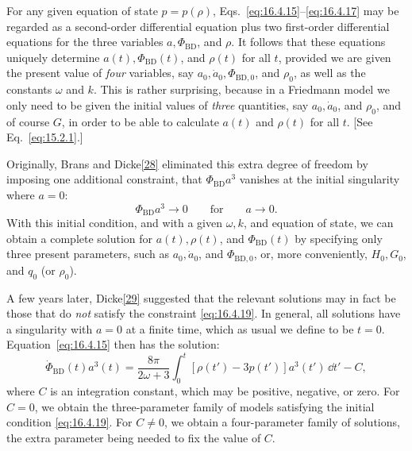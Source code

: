 For any given equation of state \(p=p(\rho)\),
Eqs.~\eqref{eq:16.4.15}--\eqref{eq:16.4.17} may be regarded as a
second-order differential equation plus two first-order differential equations
for the three variables \(a,\Phi_{\mathrm{BD}}\), and \(\rho\). It follows that
these equations uniquely determine \(a(t),\Phi_{\mathrm{BD}}(t)\), and
\(\rho(t)\) for all \(t\), provided we are given the present value of
\emph{four} variables, say \(a_0,\dot a_0,\Phi_{\mathrm{BD},0}\), and
\(\rho_0\), as well as the constants \(\omega\) and \(k\). This is rather
surprising, because in a Friedmann model we only need to be given the initial
values of \emph{three} quantities, say \(a_0,\dot a_0\), and \(\rho_0\), and
of course \(G\), in order to be able to calculate \(a(t)\) and \(\rho(t)\) for
all \(t\). [See Eq.~\eqref{eq:15.2.1}.]

Originally, Brans and Dicke\hyperref[ch16-ref-28]{[28]} eliminated this extra
degree of freedom by imposing one additional constraint, that
\(\Phi_{\mathrm{BD}}a^3\) vanishes at the initial singularity where \(a=0\):
\begin{equation}
  \Phi_{\mathrm{BD}}a^3\longrightarrow0
  \qquad\text{for}\qquad
  a\longrightarrow0.
  \tag{16.4.19}\label{eq:16.4.19}
\end{equation}
With this initial condition, and with a given \(\omega,k\), and equation of
state, we can obtain a complete solution for \(a(t),\rho(t)\), and
\(\Phi_{\mathrm{BD}}(t)\) by specifying only three present parameters, such as
\(a_0,\dot a_0\), and \(\Phi_{\mathrm{BD},0}\), or, more conveniently,
\(H_0,G_0\), and \(q_0\) (or \(\rho_0\)).

A few years later, Dicke\hyperref[ch16-ref-29]{[29]} suggested that the
relevant solutions may in fact be those that do \emph{not} satisfy the
constraint \eqref{eq:16.4.19}. In general, all solutions have a singularity
with \(a=0\) at a finite time, which as usual we define to be \(t=0\).
Equation~\eqref{eq:16.4.15} then has the solution:
\begin{equation}
  \dot\Phi_{\mathrm{BD}}(t)a^3(t)
  =
  \frac{8\pi}{2\omega+3}
  \int_0^t
    [\rho(t')-3p(t')]a^3(t')\,\dd t'
  -C,
  \tag{16.4.20}\label{eq:16.4.20}
\end{equation}
where \(C\) is an integration constant, which may be positive, negative, or
zero. For \(C=0\), we obtain the three-parameter family of models satisfying
the initial condition \eqref{eq:16.4.19}. For \(C\ne0\), we obtain a
four-parameter family of solutions, the extra parameter being needed to fix
the value of \(C\).

